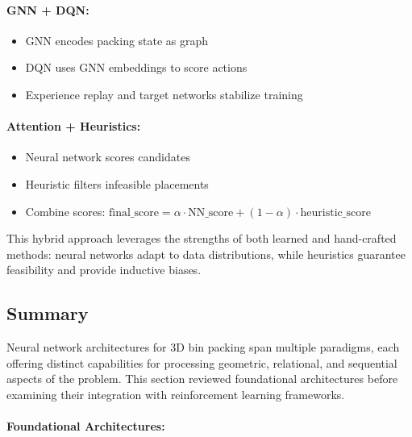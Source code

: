 \paragraph{GNN + DQN:}
\begin{itemize}
\item GNN encodes packing state as graph
\item DQN uses GNN embeddings to score actions
\item Experience replay and target networks stabilize training
\end{itemize}

\paragraph{Attention + Heuristics:}
\begin{itemize}
\item Neural network scores candidates
\item Heuristic filters infeasible placements
\item Combine scores: $\text{final\_score} = \alpha \cdot \text{NN\_score} + (1-\alpha) \cdot \text{heuristic\_score}$
\end{itemize}

This hybrid approach leverages the strengths of both learned and hand-crafted methods: neural networks adapt to data distributions, while heuristics guarantee feasibility and provide inductive biases.


\subsection{Summary}

Neural network architectures for 3D bin packing span multiple paradigms, each offering distinct capabilities for processing geometric, relational, and sequential aspects of the problem. This section reviewed foundational architectures before examining their integration with reinforcement learning frameworks.

\paragraph{Foundational Architectures:}

